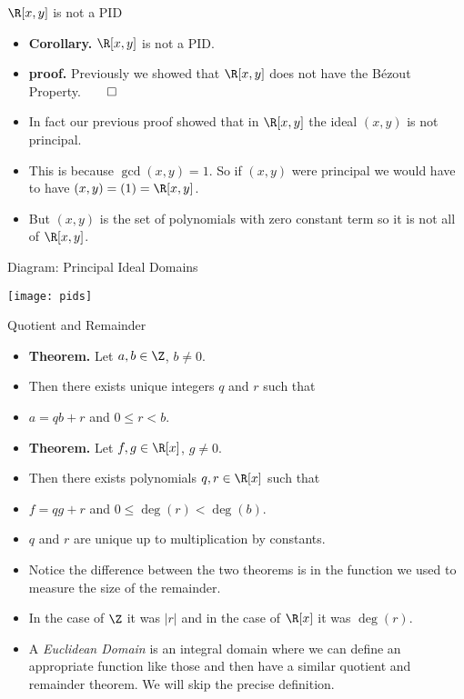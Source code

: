 \documentclass{beamer}
\begin{document}

\begin{frame}{$\R[x,y]$ is not a PID}

\begin{itemize}
  \item \textbf{Corollary.} $\R[x,y]$ is not a PID.
  \item \textbf{proof.} Previously we showed that $\R[x,y]$ does not have the B\'{e}zout Property.$\qed$
  \item In fact our previous proof showed that in $\R[x,y]$ the ideal $(x,y)$ is not principal.
  \item This is because $\gcd(x,y) = 1$. So if $(x,y)$ were principal we would have to have $(x,y) = (1) = \R[x,y]$.
  \item But $(x,y)$ is the set of polynomials with zero constant term so it is not all of $\R[x,y]$.
\end{itemize}

\end{frame}




\begin{frame}{Diagram: Principal Ideal Domains}

\begin{center}
\texttt{[image: pids]}
\end{center}

\end{frame}




\begin{frame}{Quotient and Remainder}

\begin{itemize}
  \item \textbf{Theorem.} Let $a,b\in\Z$, $b\not=0$.
  \item Then there exists unique integers $q$ and $r$ such that
  \item $a = qb +r$ and $0\leq r < b$.
  \item \textbf{Theorem.} Let $f,g\in\R[x]$, $g\not=0$.
  \item Then there exists polynomials $q,r\in\R[x]$ such that
  \item $f = qg +r$ and $0\leq \deg(r) < \deg(b)$.
  \item $q$ and $r$ are unique up to multiplication by constants.
  \item Notice the difference between the two theorems is in the function we used to measure the size of the remainder.
  \item In the case of $\Z$ it was $|r|$ and in the case of $\R[x]$ it was $\deg(r)$.
  \item A \emph{Euclidean Domain} is an integral domain where we can define an appropriate function like those and then have a similar quotient and remainder theorem. We will skip the precise definition.
\end{itemize}

\end{frame}
\end{document}
